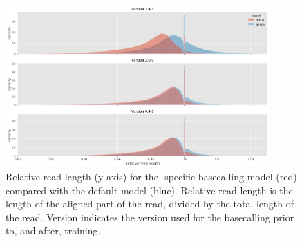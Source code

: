 \begin{figure}
\includegraphics[width=0.9\textwidth]{Chapter4/Figs/read_rel_len.png}
\centering
\caption{Relative read length (y-axis) for the \mtb{}-specific basecalling model \tubby{} (red) compared with the default \guppy{} model (blue). Relative read length is the length of the aligned part of the read, divided by the total length of the read. Version indicates the \guppy{} version used for the basecalling prior to, and after, training.}
\label{fig:read-rel-len}
\end{figure}

\begin{table}
\centering
{}
\caption{Relative read length (y-axis) for the \mtb{}-specific basecalling model \tubby{} (red) compared with the default \guppy{} model (blue). Relative read length is the length of the aligned part of the read, divided by the total length of the read. Version indicates the \guppy{} version used for the basecalling prior to, and after, training. Count refers to the number of reads evaluated. std=standard deviation.}
\label{tab:read-rel-len}
\end{table}

